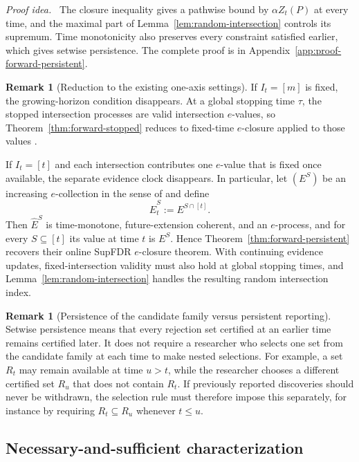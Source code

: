 \documentclass[11pt]{article}
\numberwithin{equation}{section}
\theoremstyle{plain}
\theoremstyle{definition}
\newtheorem{remark}[theorem]{Remark}
\newcommand{\proofidea}{\par\medskip\noindent\textit{Proof idea.}\ }
\begin{document}
\proofidea
The closure inequality gives a pathwise bound by $\alpha Z_t(P)$ at every time, and the maximal part of Lemma~\ref{lem:random-intersection} controls its supremum. Time monotonicity also preserves every constraint satisfied earlier, which gives setwise persistence. The complete proof is in Appendix~\ref{app:proof-forward-persistent}.

\begin{remark}[Reduction to the existing one-axis settings]\label{rem:one-axis-reductions}
If $I_t=[m]$ is fixed, the growing-horizon condition disappears. At a global stopping time $\tau$, the stopped intersection processes are valid intersection $e$-values, so Theorem~\ref{thm:forward-stopped} reduces to fixed-time $e$-closure applied to those values \citep{XuEtAl2026Closure}.

If $I_t=[t]$ and each intersection contributes one $e$-value that is
fixed once available, the separate evidence clock disappears. In
particular, let $(E^S)$ be an increasing $e$-collection in the sense of
\citet{XuFischerRamdas2026Online} and define
\[
\widehat E_t^S:=E^{S\cap[t]}.
\]
Then $\widehat E^S$ is time-monotone, future-extension coherent, and an
$e$-process, and for every $S\subseteq[t]$ its value at time $t$ is
$E^S$. Hence Theorem~\ref{thm:forward-persistent} recovers their online
SupFDR $e$-closure theorem. With continuing evidence updates,
fixed-intersection validity must also hold at global stopping times,
and Lemma~\ref{lem:random-intersection} handles the resulting random
intersection index.
\end{remark}

\begin{remark}[Persistence of the candidate family versus persistent reporting]
	\label{rem:persistence-selection}
	Setwise persistence means that every rejection set certified at an earlier
	time remains certified later. It does not require a researcher who selects
	one set from the candidate family at each time to make nested selections.
	For example, a set $R_t$ may remain available at time $u>t$, while the
	researcher chooses a different certified set $R_u$ that does not contain
	$R_t$. If previously reported discoveries should never be withdrawn, the
	selection rule must therefore impose this separately, for instance by
	requiring $R_t\subseteq R_u$ whenever $t\leq u$.
\end{remark}

\subsection{Necessary-and-sufficient characterization}\label{sec:ns-characterization}
\end{document}
